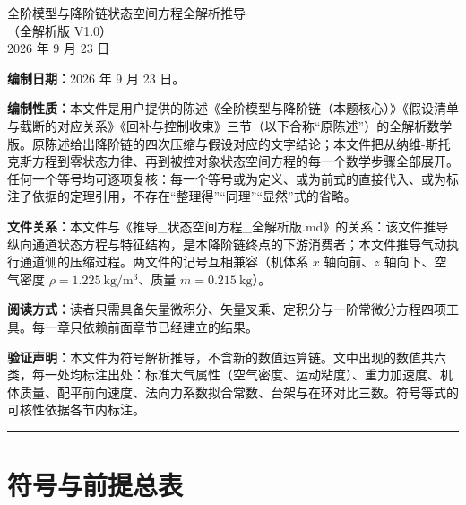 \documentclass[11pt,a4paper]{ctexart}
\numberwithin{equation}{section}
\begin{document}
\begin{center}
  {\LARGE\heiti 全阶模型与降阶链状态空间方程全解析推导}\\[0.6em]
  {\large（全解析版 V1.0）}\\[1.2em]
  {\large 2026 年 9 月 23 日}
\end{center}

\vspace{0.5em}

\noindent\textbf{编制日期：}2026 年 9 月 23 日。

\medskip

\noindent\textbf{编制性质：}本文件是用户提供的陈述《全阶模型与降阶链（本题核心）》《假设清单与截断的对应关系》《回补与控制收束》三节（以下合称“原陈述”）的全解析数学版。原陈述给出降阶链的四次压缩与假设对应的文字结论；本文件把从纳维-斯托克斯方程到零状态力律、再到被控对象状态空间方程的每一个数学步骤全部展开。任何一个等号均可逐项复核：每一个等号或为定义、或为前式的直接代入、或为标注了依据的定理引用，不存在“整理得”“同理”“显然”式的省略。

\medskip

\noindent\textbf{文件关系：}本文件与《推导\_状态空间方程\_全解析版.md》的关系：该文件推导纵向通道状态方程与特征结构，是本降阶链终点的下游消费者；本文件推导气动执行通道侧的压缩过程。两文件的记号互相兼容（机体系 $x$ 轴向前、$z$ 轴向下、空气密度 $\rho = 1.225\ \mathrm{kg/m^3}$、质量 $m = 0.215\ \mathrm{kg}$）。

\medskip

\noindent\textbf{阅读方式：}读者只需具备矢量微积分、矢量叉乘、定积分与一阶常微分方程四项工具。每一章只依赖前面章节已经建立的结果。

\medskip

\noindent\textbf{验证声明：}本文件为符号解析推导，不含新的数值运算链。文中出现的数值共六类，每一处均标注出处：标准大气属性（空气密度、运动粘度）、重力加速度、机体质量、配平前向速度、法向力系数拟合常数、台架与在环对比三数。符号等式的可核性依据各节内标注。

\vspace{1em}
\hrule
\vspace{1em}

{\small\tableofcontents}

\clearpage

\setcounter{section}{-1}
\section{符号与前提总表}\label{sec:intro}
\end{document}
